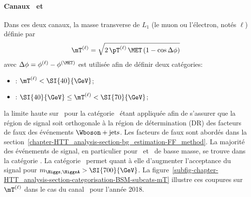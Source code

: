 \paragraph{Canaux \mu\tauh\ et \ele\tauh}
Dans ces deux canaux, la masse transverse de $L_1$ (le muon ou l'électron, notés $\ell$) définie par
\begin{equation}
\mT^{(\ell)} = \sqrt{2 \, \pT^{(\ell)} \, \MET \, (1-\cos\Delta\phi)} \label{eq-mT_def-ell}
\end{equation}
avec $\Delta\phi = \phi^{(\ell)} - \phi^{(\MET)}$
est utilisée afin de définir deux catégories:
\begin{itemize}
\item \CATtightmt: $\mT^{(\ell)} < \SI{40}{\GeV}$;
\item \CATloosemt: $\SI{40}{\GeV} \leq \mT^{(\ell)} < \SI{70}{\GeV}$;
\end{itemize}
la limite haute sur \mT\ pour la catégorie \CATloosemt\ étant appliquée afin de s'assurer que la région de signal soit orthogonale à la région de détermination (DR) des facteurs de faux des événements $\Wboson+\text{jets}$.
Les facteurs de faux sont abordés dans la section~\ref{chapter-HTT_analysis-section-bg_estimation-FF_method}.
La majorité des événements de signal, en particulier pour \Higgs\ et \HiggsA\ de basse masse, se trouve dans la catégorie \CATtightmt.
La catégorie \CATloosemt\ permet quant à elle d'augmenter l'acceptance du signal pour $m_{\Higgs,\HiggsA} > \SI{700}{\GeV}$.
La figure~\ref{subfig-chapter-HTT_analysis-section-categorisation-BSM-subcats-mT} illustre ces coupures sur $\mT^{(\ell)}$ dans le cas du canal \ele\tauh\ pour l'année 2018.
